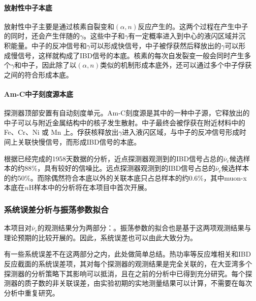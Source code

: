 \documentclass[a4paper,zihao=-4]{article}
\begin{document}
\paragraph{}
\paragraph{放射性中子本底}
放射性中子主要是通过核素自裂变和$(\alpha,n)$反应产生的。这两个过程在产生中子的同时，还会产生伴随的$\gamma$。这些中子和$\gamma$有一定概率进入到中心的液闪区域并沉积能量。中子的反冲信号和$\gamma$可以形成快信号，中子被俘获然后释放出的$\gamma$可以形成慢信号，这样就构成了IBD信号的本底。核素的每次自发裂变一般会同时产生多个$\gamma$和中子，因此除了以$(\alpha,n)$类似的机制形成本底外，还可以通过多个中子俘获之间的符合形成本底。
\paragraph{Am-C中子刻度源本底}
探测器顶部安置有自动刻度单元。Am-C刻度源是其中的一种中子源，它释放出的中子可以与附近金属结构中的核子发生散射。中子最终会被俘获在附近材料中的 Fe、Cr、Ni 或 Mn 上。俘获核释放出$\gamma$进入液闪区域，与中子的反冲信号形成时间上关联快慢信号，而形成IBD信号的本底。

根据已经完成的1958天数据的分析，近点探测器观测到的IBD信号占总的$\overline{\nu}_e$候选样本的约88\%，具有较好的信噪比。远点探测器观测到的IBD信号占总的$\overline{\nu}_e$候选样本的约50\%。而除偶然符合本底以外的关联本底只占总样本的约0.6\%，其中muon-x本底在$n$H样本中的分析将在本项目中首次开展。

\subsubsection{系统误差分析与振荡参数拟合}\label{sec:uncertainty}
本项目对$\overline{\nu}_e$的观测结果分为两部分：。振荡参数的拟合也是基于这两项观测结果与理论预期的比较开展的。因此，系统误差也可以由此大致分为。

有一些系统误差不在这两部分之内，此处做简单总结。热功率等反应堆相关和IBD反应截面的系统误差项，其对每个探测器的观测结果是完全关联的，在大亚湾多个探测器的分析策略下其影响可以抵消，且在之前的分析中已得到充分研究。每个探测器的质子数的非关联误差，由实验初期的实地测量结果可以计算，不需要在每次分析中重复研究。
\end{document}

